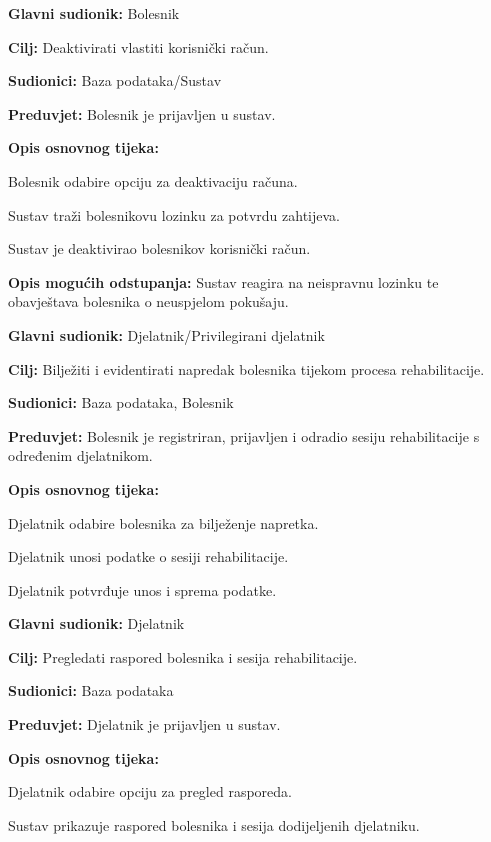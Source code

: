 	\item \textbf{Glavni sudionik:} Bolesnik
	\item \textbf{Cilj:} Deaktivirati vlastiti korisnički račun.
	\item \textbf{Sudionici:} Baza podataka/Sustav
	\item \textbf{Preduvjet:} Bolesnik je prijavljen u sustav.
	\item \textbf{Opis osnovnog tijeka:}
	\begin{packed_enum}
		\item Bolesnik odabire opciju za deaktivaciju računa.
		\item Sustav traži bolesnikovu lozinku za potvrdu zahtijeva.
		\item Sustav je deaktivirao bolesnikov korisnički račun.
	\end{packed_enum}
	\item \textbf{Opis mogućih odstupanja:}
	Sustav reagira na neispravnu lozinku te obavještava bolesnika o neuspjelom pokušaju.
\closeusecase

	\item \textbf{Glavni sudionik:} Djelatnik/Privilegirani djelatnik
	\item \textbf{Cilj:} Bilježiti i evidentirati napredak bolesnika tijekom procesa rehabilitacije.
	\item \textbf{Sudionici:} Baza podataka, Bolesnik
	\item \textbf{Preduvjet:} Bolesnik je registriran, prijavljen i odradio sesiju rehabilitacije s određenim djelatnikom.
	\item \textbf{Opis osnovnog tijeka:}
	\begin{packed_enum}
		\item Djelatnik odabire bolesnika za bilježenje napretka.
		\item Djelatnik unosi podatke o sesiji rehabilitacije.
		\item Djelatnik potvrđuje unos i sprema podatke.
	\end{packed_enum}
\closeusecase

	\item \textbf{Glavni sudionik:} Djelatnik
	\item \textbf{Cilj:} Pregledati raspored bolesnika i sesija rehabilitacije.
	\item \textbf{Sudionici:} Baza podataka
	\item \textbf{Preduvjet:} Djelatnik je prijavljen u sustav.
	\item \textbf{Opis osnovnog tijeka:}
	\begin{packed_enum}
		\item Djelatnik odabire opciju za pregled rasporeda.
		\item Sustav prikazuje raspored bolesnika i sesija dodijeljenih djelatniku.
	\end{packed_enum}
\closeusecase

